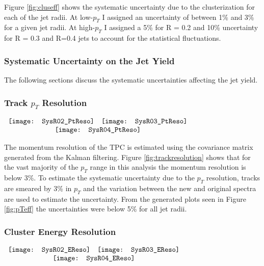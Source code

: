 Figure \ref{fig:cluseff} shows the systematic uncertainty due to the clusterization for each of the jet radii.  At low-$p_{T}$ I assigned an uncertainty of between 1\% and 3\% for a given jet radii.  At high-$p_{T}$ I assigned a 5\% for R = 0.2 and 10\% uncertainty for R = 0.3 and R=0.4 jets to account for the statistical fluctuations.

\subsubsection{Systematic Uncertainty on the Jet Yield}

The following sections discuss the systematic uncertainties affecting the jet yield.

\subsubsection{Track $p_{T}$ Resolution}


\begin{figure*}[t!]
$\begin{array}{rl}
    \texttt{[image: SysR02\_PtReso]} &
    \texttt{[image: SysR03\_PtReso]}\\
    \multicolumn{2}{c}{\texttt{[image: SysR04\_PtReso]}}
\end{array}$
\caption[Systematic due to $P_{T}$ resolution.]{\label{fig:pTeff}$P_{T}$ resolution systematic uncertainty; R = 0.2 \textit{(top left)}, R = 0.3 \textit{(top right)}, R = 0.4 \textit{(bottom)}.}
\end{figure*}

\noindent
The momentum resolution of the TPC is estimated using the covariance matrix generated from the Kalman filtering\cite{Fruhwirth:1987fm}.  Figure \ref{fig:trackresolution} shows that for the vast majority of the $p_{T}$ range in this analysis the  momentum resolution is below 3\%.  To estimate the systematic uncertainty due to the $p_{T}$ resolution, tracks are smeared by 3\% in $p_{T}$ and the variation between the new and original spectra are used to estimate the uncertainty.  From the generated plots seen in Figure \ref{fig:pTeff} the uncertainties were below 5\% for all jet radii.

\subsubsection{Cluster Energy Resolution}

\begin{figure*}[t!]
$\begin{array}{rl}
    \texttt{[image: SysR02\_EReso]} &
    \texttt{[image: SysR03\_EReso]}\\
    \multicolumn{2}{c}{\texttt{[image: SysR04\_EReso]}}
\end{array}$
\caption[Systematic due to energy resolution.]{\label{fig:Eeff}Systematic uncertainty due to the energy resolution; R = 0.2 \textit{(top left)}, R = 0.3 \textit{(top right)}, R = 0.4 \textit{(bottom)}.}
\end{figure*}

